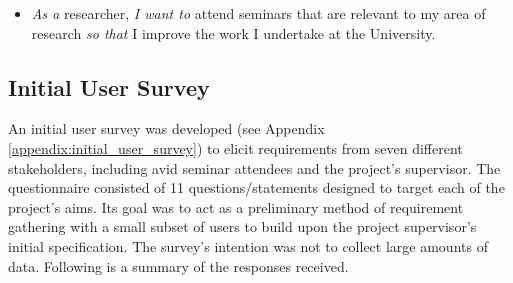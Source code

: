 \documentclass{l4proj}
\begin{document}
\begin{itemize}
    \item \emph{As a} researcher, \emph{I want to} attend seminars that are relevant to my area of research \emph{so that} I improve the work I undertake at the University.
\end{itemize}

\subsection{Initial User Survey}

An initial user survey was developed (see Appendix \ref{appendix:initial_user_survey}) to elicit requirements from seven different stakeholders, including avid seminar attendees and the project's supervisor. The questionnaire consisted of 11 questions/statements designed to target each of the project's aims. Its goal was to act as a preliminary method of requirement gathering with a small subset of users to build upon the project supervisor's initial specification. The survey's intention was not to collect large amounts of data. Following is a summary of the responses received.
\end{document}
